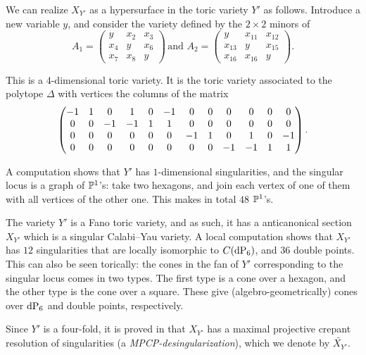 We can realize $X_{Y'}$ as a hypersurface in the toric variety $Y'$ as follows. Introduce a new variable $y$, and consider the variety defined by the $2 \times 2$ minors of
\[
A_1 = \begin{pmatrix}
y   & x_2 & x_3 \\
x_4 & y  & x_6 \\
x_7 & x_8 & y
\end{pmatrix}\,
\text{and }
A_2 = \begin{pmatrix}
y & x_{11} & x_{12} \\
x_{13} & y & x_{15} \\
x_{16} & x_{16} & y
\end{pmatrix}.
\]

This is a $4$-dimensional toric variety. It is the toric variety associated to the polytope $\Delta$ with vertices the columns of the matrix
\[
 \makeatletter\c@MaxMatrixCols=12\makeatother\begin{pmatrix}{-1}&      1&      0&      1&      0&      {-1}&      0&      0&      0&      0&      0&      0\\      0&      0&      {-1}&      {-1}&      1&      1&      0&      0&      0&      0&      0&      0\\      0&      0&      0&      0&      0&      0&      {-1}&      1&      0&      1&      0&      {-1}\\      0&      0&      0&      0&      0&      0&      0&      0&      {-1}&      {-1}&      1&      1\\      \end{pmatrix}.
\]

A computation shows that $Y'$ has $1$-dimensional singularities, and the singular locus is a graph of $\P^1$'s: take two hexagons, and join each vertex of one of them with all vertices of the other one. This makes in total $48$ $\P^1$'s.

The variety $Y'$ is a Fano toric variety, and as such, it has a anticanonical section $X_{Y'}$ which is a singular Calabi--Yau variety. A local computation shows that $X_{Y'}$ has $12$ singularities that are locally isomorphic to $C(\dP6)$, and $36$ double points. This can also be seen torically: the cones in the fan of $Y'$ corresponding to the singular locus comes in two types. The first type is a cone over a hexagon, and the other type is the cone over a square. These give (algebro-geometrically) cones over $\dP6$ and double points, respectively.

Since $Y'$ is a four-fold, it is proved in \cite{mirrorsymmetry} that $X_{Y'}$ has a maximal projective crepant resolution of singularities (a \emph{MPCP-desingularization}), which we denote by $\widetilde{X_{Y'}}$.

